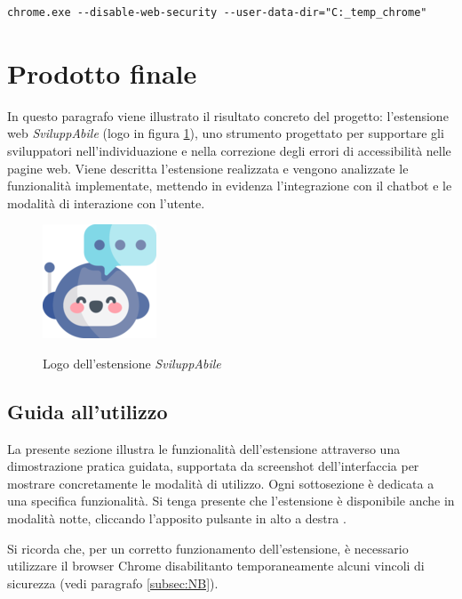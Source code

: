 \begin{verbatim}
chrome.exe --disable-web-security --user-data-dir="C:_temp_chrome"
\end{verbatim}


\section{Prodotto finale}
\noindent In questo paragrafo viene illustrato il risultato concreto del progetto: l’estensione web \textit{SviluppAbile} (logo in figura \ref{fig:logo_sviluppabile}), uno strumento progettato per supportare gli sviluppatori nell’individuazione e nella correzione degli errori di accessibilità nelle pagine web. Viene descritta l’estensione realizzata e vengono analizzate le funzionalità implementate, mettendo in evidenza l’integrazione con il chatbot e le modalità di interazione con l’utente.

\begin{figure}[H]
    \centering
    \includegraphics[width=0.15\linewidth, alt={Logo dell'estensione \textit{SviluppAbile}}]{img/sviluppabile.png}
    \caption{Logo dell'estensione \textit{SviluppAbile}}\label{fig:logo_sviluppabile}
\end{figure}

\subsection{Guida all'utilizzo}
\noindent La presente sezione illustra le funzionalità dell’estensione attraverso una dimostrazione pratica guidata, supportata da screenshot dell’interfaccia per mostrare concretamente le modalità di utilizzo. Ogni sottosezione è dedicata a una specifica funzionalità. Si tenga presente che l'estensione è disponibile anche in modalità notte, cliccando l'apposito pulsante in alto a destra .

\noindent Si ricorda che, per un corretto funzionamento dell'estensione, è necessario utilizzare il browser Chrome disabilitanto temporaneamente alcuni vincoli di sicurezza (vedi paragrafo \ref{subsec:NB}).

